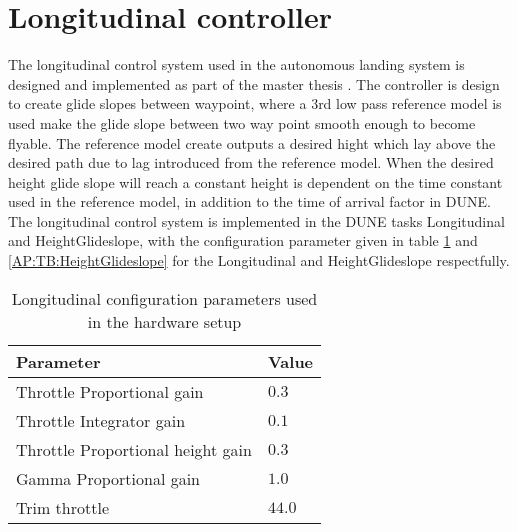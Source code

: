 \section{Longitudinal controller}
The longitudinal control system used in the autonomous landing system is designed and implemented as part of the master thesis \citep{Sigurd}. The controller is design to create glide slopes between waypoint, where a 3rd low pass reference model is used make the glide slope between two way point smooth enough to become flyable. The reference model create outputs a desired hight which lay above the desired path due to lag introduced from the reference model. When the desired height glide slope will reach a constant height is dependent on the time constant used in the reference model, in addition to the time of arrival factor in DUNE. The longitudinal control system is implemented in the DUNE tasks Longitudinal and HeightGlideslope, with the configuration parameter given in table \ref{AP:TB:Longitudianl} and \ref{AP:TB:HeightGlideslope} for the Longitudinal and HeightGlideslope respectfully.
\begin{table}[H]
\centering
\begin{tabular}{| l | l |}
\hline
\textbf{Parameter}	&	\textbf{Value} \\ \hline
Throttle Proportional gain          &    $0.3$ \\ \hline
Throttle Integrator gain            &    $0.1$ \\ \hline
Throttle Proportional height gain   &    $0.3$ \\ \hline
Gamma Proportional gain             &    $1.0$ \\ \hline
Trim throttle                       &    $44.0$ \\ \hline
\end{tabular}
\caption{Longitudinal configuration parameters used in the hardware setup}
\label{AP:TB:Longitudianl}
\end{table}

